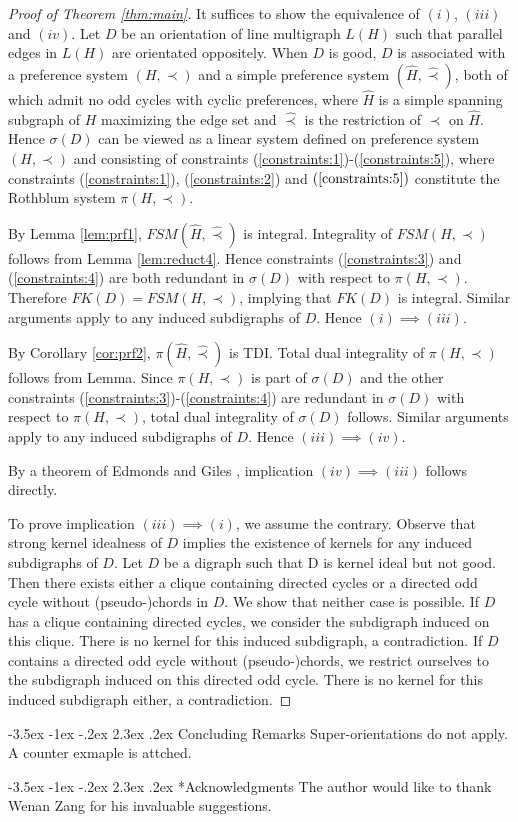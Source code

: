 \documentclass[11pt]{article}
\makeatletter
\numberwithin{theorem}{section}
\renewcommand\section{%
  \@startsection{section}{1}
                {\z@}%
                {-3.5ex \@plus -1ex \@minus -.2ex}%
                {2.3ex \@plus.2ex}%
                {\large\bfseries}%
}
\makeatother
\begin{document}
\begin{proof}[Proof of Theorem \ref{thm:main}]
It suffices to show the equivalence of $(i)$, $(iii)$ and $(iv)$. Let $D$ be an orientation of line multigraph $L(H)$ such that parallel edges in $L(H)$ are orientated oppositely. When $D$ is good, $D$ is associated with a preference system $(H,\prec)$ and a simple preference system $(\hat{H},\hat\prec)$, both of which admit no odd cycles with cyclic preferences, where $\hat{H}$ is a simple spanning subgraph of $H$ maximizing the edge set and $\hat\prec$ is the restriction of $\prec$ on $\hat{H}$.
Hence $\sigma(D)$ can be viewed as a linear system defined on preference system $(H,\prec)$ and consisting of constraints (\ref{constraints:1})-(\ref{constraints:5}), where constraints (\ref{constraints:1}), (\ref{constraints:2}) and $(\ref{constraints:5})$ constitute the Rothblum system $\pi(H,\prec)$.

By Lemma \ref{lem:prf1}, $FSM(\hat{H},\hat\prec)$ is integral. Integrality of $FSM(H,\prec)$ follows from Lemma \ref{lem:reduct4}. Hence constraints (\ref{constraints:3}) and (\ref{constraints:4}) are both redundant in $\sigma(D)$ with respect to $\pi(H,\prec)$.
Therefore $FK(D)=FSM(H,\prec)$, implying that $FK(D)$ is integral. Similar arguments apply to any induced subdigraphs of $D$. Hence $(i)\implies (iii)$.

By Corollary \ref{cor:prf2}, $\pi(\hat{H},\hat\prec)$ is TDI. Total dual integrality of $\pi(H,\prec)$ follows from Lemma. Since $\pi(H,\prec)$ is part of $\sigma(D)$ and the other constraints (\ref{constraints:3})-(\ref{constraints:4}) are redundant in $\sigma(D)$ with respect to $\pi(H,\prec)$, total dual integrality of $\sigma(D)$ follows. Similar arguments apply to any induced subdigraphs of $D$. Hence $(iii)\implies (iv)$.

By a theorem of Edmonds and Giles \cite{EdmoGile77}, implication $(iv)\implies (iii)$ follows directly.

To prove implication $(iii)\implies (i)$, we assume the contrary. Observe that strong kernel idealness of $D$ implies the existence of kernels for any induced subdigraphs of $D$. Let $D$ be a digraph such that D is kernel ideal but not good. Then there exists either a clique containing directed cycles or a directed odd cycle without (pseudo-)chords in $D$. We show that neither case is possible. If $D$ has a clique containing directed cycles, we consider the subdigraph induced on this clique. There is no kernel for this induced subdigraph, a contradiction. If $D$ contains a directed odd cycle without (pseudo-)chords, we restrict ourselves to the subdigraph induced on this directed odd cycle. There is no kernel for this induced subdigraph either, a contradiction.
\end{proof}

\section{Concluding Remarks}
Super-orientations do not apply. A counter exmaple is attched.

\section*{Acknowledgments}
The author would like to thank Wenan Zang for his invaluable suggestions.



\nocite{Schr86}
\end{document}
